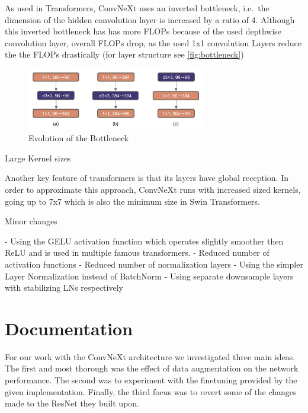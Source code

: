 \documentclass{article}
\begin{document}
As used in Transformers, ConvNeXt uses an inverted bottleneck, i.e.\ the dimension of the hidden convolution layer is increased by a ratio of 4.
Although this inverted bottleneck has has more FLOPs because of the used depthwise convolution layer, overall FLOPs drop, as the used 1x1 convolution Layers reduce the the FLOPs drastically (for layer structure see \autoref{fig:bottleneck})
\begin{figure}[h]
    \centering
    \includegraphics[width=0.7\textwidth]{images/bottleneck}
    \caption{Evolution of the Bottleneck\cite{liu2022convnet}}
    \label{fig:bottleneck}
\end{figure}

Large Kernel sizes

Another key feature of transformers is that its layers have global reception.
In order to approximate this approach, ConvNeXt runs with increased sized kernels, going up to 7x7 which is also the minimum size in Swin Transformers.

Minor changes

- Using the GELU activation function which operates slightly smoother then ReLU and is used in multiple famous transformers.
- Reduced number of activation functions
- Reduced number of normalization layers
- Using the simpler Layer Normalization instead of BatchNorm
- Using separate downsample layers with stabilizing LNs respectively


\section{Documentation}\label{sec:documentation}
For our work with the ConvNeXt architecture we investigated three main ideas.
The first and most thorough was the effect of data augmentation on the network performance.
The second was to experiment with the finetuning provided by the given implementation.
Finally, the third focus was to revert some of the changes~ made to the ResNet they built upon.
\end{document}
